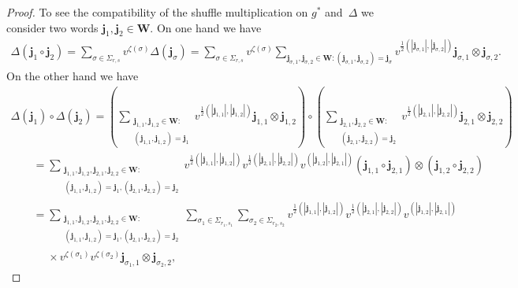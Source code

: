 \documentclass[11pt]{article}
\numberwithin{equation}{section}
\begin{document}
\begin{proof}
To see the compatibility of the shuf\/f\/le multiplication on $g^*$ and~$\Delta$ we consider two words
$\mathbf{j}_1,\mathbf{j}_2\in\mathbf{W}$.
On one hand we have
\begin{gather*}
\Delta(\mathbf{j}_1\circ\mathbf{j}_2)=\sum\limits_{\sigma\in\Sigma_{r,s}}v^{\zeta(\sigma)}\Delta(\mathbf{j}_\sigma)
=\sum\limits_{\sigma\in\Sigma_{r,s}}v^{\zeta(\sigma)}
\sum\limits_{\mathbf{j}_{\sigma,1},\mathbf{j}_{\sigma,2}\in\mathbf{W}:(\mathbf{j}_{\sigma,1},\mathbf{j}_{\sigma,2})=\mathbf{j}_\sigma}
v^{\frac{1}{2}(|\mathbf{j}_{\sigma,1}|,|\mathbf{j}_{\sigma,2}|)}\mathbf{j}_{\sigma,1}\otimes\mathbf{j}_{\sigma,2}.
\end{gather*}
On the other hand we have
\begin{gather*}
\Delta(\mathbf{j}_1)\circ\Delta(\mathbf{j}_2)
=\left(\sum\limits_{\substack{\mathbf{j}_{1,1},\mathbf{j}_{1,2}\in\mathbf{W}:\\(\mathbf{j}_{1,1},\mathbf{j}_{1,2})=\mathbf{j}_1}}
v^{\frac{1}{2}(|\mathbf{j}_{1,1}|,|\mathbf{j}_{1,2}|)}\mathbf{j}_{1,1}\otimes\mathbf{j}_{1,2}\right)\!
\circ\!\left(\sum\limits_{\substack{\mathbf{j}_{2,1},\mathbf{j}_{2,2}\in\mathbf{W}:\\(\mathbf{j}_{2,1},\mathbf{j}_{2,2})=\mathbf{j}_2}}
v^{\frac{1}{2}(|\mathbf{j}_{2,1}|,|\mathbf{j}_{2,2}|)}\mathbf{j}_{2,1}\otimes\mathbf{j}_{2,2}\right)
\\
\qquad
=\sum\limits_{\substack{\mathbf{j}_{1,1},\mathbf{j}_{1,2},\mathbf{j}_{2,1},\mathbf{j}_{2,2}\in\mathbf{W}:\\
(\mathbf{j}_{1,1},\mathbf{j}_{1,2})=\mathbf{j}_1,(\mathbf{j}_{2,1},\mathbf{j}_{2,2})=\mathbf{j}_2}}
v^{\frac{1}{2}(|\mathbf{j}_{1,1}|,|\mathbf{j}_{1,2}|)}v^{\frac{1}{2}(|\mathbf{j}_{2,1}|,|\mathbf{j}_{2,2}|)}
v^{(|\mathbf{j}_{1,2}|,|\mathbf{j}_{2,1}|)}(\mathbf{j}_{1,1}\circ\mathbf{j}_{2,1})\otimes(\mathbf{j}_{1,2}\circ\mathbf{j}_{2,2})
\\
\qquad
=\sum\limits_{\substack{\mathbf{j}_{1,1},\mathbf{j}_{1,2},\mathbf{j}_{2,1},\mathbf{j}_{2,2}\in\mathbf{W}:\\
(\mathbf{j}_{1,1},\mathbf{j}_{1,2})=\mathbf{j}_1,(\mathbf{j}_{2,1},\mathbf{j}_{2,2})=\mathbf{j}_2}}
\sum\limits_{\sigma_1\in\Sigma_{r_1,s_1}}
\sum\limits_{\sigma_2\in\Sigma_{r_2,s_2}}v^{\frac{1}{2}(|\mathbf{j}_{1,1}|,|\mathbf{j}_{1,2}|)}
v^{\frac{1}{2}(|\mathbf{j}_{2,1}|,|\mathbf{j}_{2,2}|)}v^{(|\mathbf{j}_{1,2}|,|\mathbf{j}_{2,1}|)}
\\
\qquad\phantom{=}  \times
v^{\zeta(\sigma_1)}v^{\zeta(\sigma_2)}\mathbf{j}_{\sigma_1,1}\otimes\mathbf{j}_{\sigma_2,2},

\end{gather*}
\end{proof}
\end{document}
